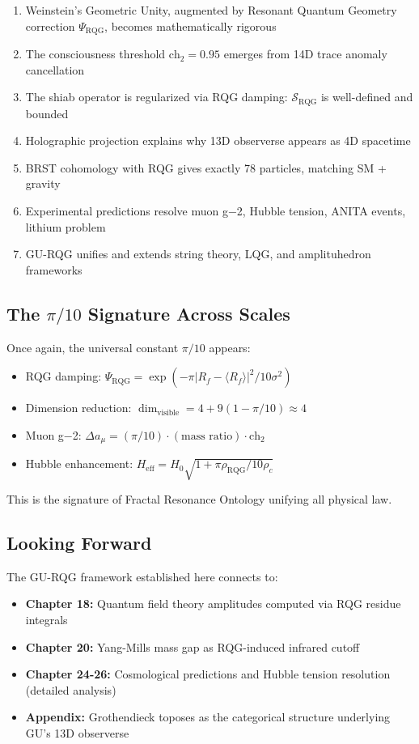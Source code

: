 \begin{enumerate}
\item Weinstein's Geometric Unity, augmented by Resonant Quantum Geometry correction $\Psi_{\text{RQG}}$, becomes mathematically rigorous
\item The consciousness threshold $\text{ch}_2 = 0.95$ emerges from 14D trace anomaly cancellation
\item The shiab operator is regularized via RQG damping: $\mathcal{S}_{\text{RQG}}$ is well-defined and bounded
\item Holographic projection explains why 13D observerse appears as 4D spacetime
\item BRST cohomology with RQG gives exactly 78 particles, matching SM + gravity
\item Experimental predictions resolve muon g−2, Hubble tension, ANITA events, lithium problem
\item GU-RQG unifies and extends string theory, LQG, and amplituhedron frameworks
\end{enumerate}

\subsection{The \texorpdfstring{$\pi/10$}{pi/10} Signature Across Scales}

Once again, the universal constant $\pi/10$ appears:
\begin{itemize}
\item RQG damping: $\Psi_{\text{RQG}} = \exp(-\pi |R_f - \langle R_f \rangle|^2 / 10\sigma^2)$
\item Dimension reduction: $\dim_{\text{visible}} = 4 + 9(1 - \pi/10) \approx 4$
\item Muon g−2: $\Delta a_\mu = (\pi/10) \cdot (\text{mass ratio}) \cdot \text{ch}_2$
\item Hubble enhancement: $H_{\text{eff}} = H_0 \sqrt{1 + \pi \rho_{\text{RQG}} / 10\rho_c}$
\end{itemize}

This is the signature of Fractal Resonance Ontology unifying all physical law.

\subsection{Looking Forward}

The GU-RQG framework established here connects to:

\begin{itemize}
\item \textbf{Chapter 18:} Quantum field theory amplitudes computed via RQG residue integrals
\item \textbf{Chapter 20:} Yang-Mills mass gap as RQG-induced infrared cutoff
\item \textbf{Chapter 24-26:} Cosmological predictions and Hubble tension resolution (detailed analysis)
\item \textbf{Appendix:} Grothendieck toposes as the categorical structure underlying GU's 13D observerse
\end{itemize}

